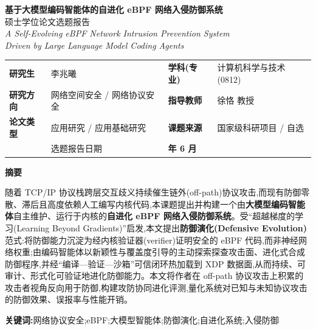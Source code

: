 \documentclass[11pt,a4paper]{ctexart}
\begin{document}
\sloppy
\begin{center}
  {\bfseries\heiti 基于大模型编码智能体的自进化 eBPF 网络入侵防御系统}\\[6pt]
  {\heiti 硕士学位论文选题报告}\\[10pt]
  {\itshape A Self-Evolving eBPF Network Intrusion Prevention System\\ Driven by Large Language Model Coding Agents}\\[14pt]
\end{center}

\begin{center}
\renewcommand{\arraystretch}{1.3}
\begin{tabularx}{0.92\textwidth}{>{\bfseries\heiti}l X >{\bfseries\heiti}l X}
\toprule
研究生 & 李兆曦 & 学科(专业) & 计算机科学与技术(0812) \\
研究方向 & 网络空间安全 / 网络协议安全 & 指导教师 & 徐恪 教授 \\
论文类型 & 应用研究 / 应用基础研究 & 课题来源 & 国家级科研项目 / 自选 \\
\multicolumn{2}{l}{} & 选题报告日期 & 2026 年 6 月 \\
\bottomrule
\end{tabularx}
\end{center}
\vspace{8pt}

\begin{center}\textbf{\heiti\large 摘\quad 要}\end{center}
\noindent 随着 TCP/IP 协议栈跨层交互歧义持续催生链外(off-path)协议攻击,而现有防御零散、滞后且高度依赖人工编写内核代码,本课题提出并构建一个由\textbf{大模型编码智能体}自主维护、运行于内核的\textbf{自进化 eBPF 网络入侵防御系统}。受“超越梯度的学习(Learning Beyond Gradients)”启发,本文提出\textbf{防御演化(Defensive Evolution)}范式:将防御能力沉淀为经内核验证器(verifier)证明安全的 eBPF 代码,而非神经网络权重;由编码智能体以新颖性与覆盖度引导的主动探索探查攻击面、进化式合成防御程序,并经“编译—验证—沙箱”可信闭环热加载到 XDP 数据面,从而持续、可审计、形式化可验证地进化防御能力。本文将作者在 off-path 协议攻击上积累的攻击者视角反向用于防御,构建攻防协同进化评测,量化系统对已知与未知协议攻击的防御效果、误报率与性能开销。

\smallskip
\noindent\textbf{\heiti 关键词:}网络协议安全;eBPF;大模型智能体;防御演化;自进化系统;入侵防御
\end{document}
